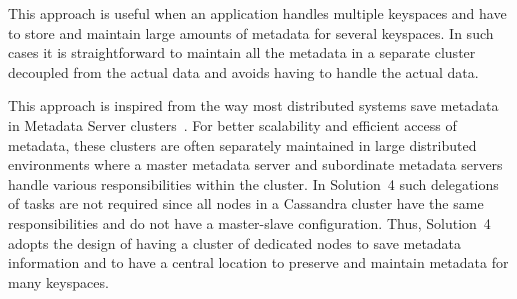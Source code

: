 This  approach is useful when an application handles multiple keyspaces
and have to store and maintain large amounts of metadata  for  several
keyspaces. 
In such cases it is straightforward  to maintain all the metadata  in a
separate cluster  decoupled from the actual data and avoids having to handle
the actual data. 
 
 This approach is inspired from the way most distributed systems save metadata
 in Metadata Server clusters~\citep{bin-et-al,Fu,lin}.
 For better scalability and efficient access of metadata,  these clusters are
 often separately maintained in large distributed environments where a master
 metadata server and subordinate metadata servers handle various
 responsibilities within the cluster.
 In Solution~4 such delegations of tasks are not required since all nodes in a
 Cassandra cluster  have the same responsibilities and do not have a
 master-slave configuration.  Thus, Solution~4  adopts the design of having
 a cluster of dedicated nodes to save metadata information and to have a central
 location to preserve and maintain metadata for many keyspaces.
 